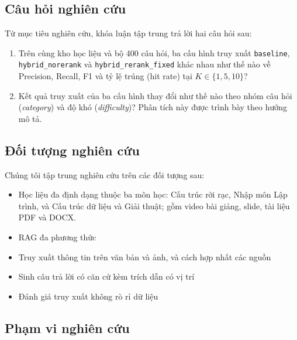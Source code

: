 \subsection{Câu hỏi nghiên cứu}\label{sec:cau-hoi-nghien-cuu}

Từ mục tiêu nghiên cứu, khóa luận tập trung trả lời hai câu hỏi sau:
\begin{enumerate}
    \item[\textbf{RQ1}] Trên cùng kho học liệu và bộ 400 câu hỏi, ba cấu hình truy xuất \texttt{baseline}, \texttt{hybrid\_norerank} và \texttt{hybrid\_rerank\_fixed} khác nhau như thế nào về Precision, Recall, F1 và tỷ lệ trúng (hit rate) tại $K \in \{1,5,10\}$?
    \item[\textbf{RQ2}] Kết quả truy xuất của ba cấu hình thay đổi như thế nào theo nhóm câu hỏi (\textit{category}) và độ khó (\textit{difficulty})? Phân tích này được trình bày theo hướng mô tả.
\end{enumerate}

\subsection{Đối tượng nghiên cứu}

Chúng tôi tập trung nghiên cứu trên các đối tượng sau:

\begin{itemize}
    \item Học liệu đa định dạng thuộc ba môn học: Cấu trúc rời rạc, Nhập môn Lập trình, và Cấu trúc dữ liệu và Giải thuật; gồm video bài giảng, slide, tài liệu PDF và DOCX.
    \item RAG đa phương thức
    \item Truy xuất thông tin trên văn bản và ảnh, và cách hợp nhất các nguồn
    \item Sinh câu trả lời có căn cứ kèm trích dẫn có vị trí
    \item Đánh giá truy xuất không rò rỉ dữ liệu
\end{itemize}

\subsection{Phạm vi nghiên cứu}

